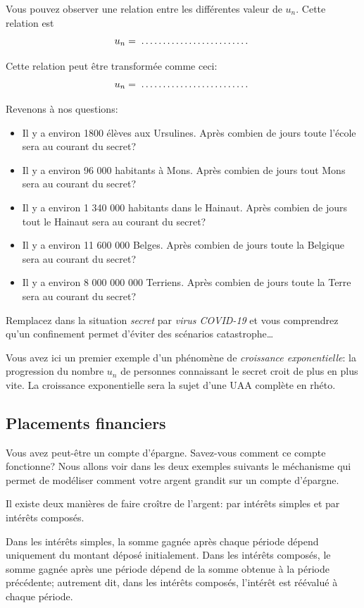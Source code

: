 \documentclass[a4paper,12pt]{report}
\newcommand{\jdot}[1]{ \makebox[#1]{\dotfill}}
\begin{document}
Vous pouvez observer une relation entre les différentes valeur de \(u_{n}\). Cette
relation est
\[
u_{n}=\jdot{4cm}
\]

Cette relation peut être transformée comme ceci:
\[
u_{n}=\jdot{4cm}
\]

Revenons à nos questions:

\begin{itemize}
\item Il y a environ 1800 élèves aux Ursulines. Après combien de jours toute l'école
sera au courant du secret?\dotfill
\item Il y a environ 96 000 habitants à Mons. Après combien de jours tout Mons
sera au courant du secret?\dotfill
\item Il y a environ 1 340 000 habitants dans le Hainaut. Après combien de jours
tout le Hainaut sera au courant du secret?\dotfill
\item Il y a environ 11 600 000 Belges. Après combien de jours toute la Belgique
sera au courant du secret?\dotfill
\item Il y a environ 8 000 000 000 Terriens. Après combien de jours toute la Terre
sera au courant du secret?\dotfill
\end{itemize}

Remplacez dans la situation \emph{secret} par \emph{virus COVID-19} et vous comprendrez
qu'un confinement permet d'éviter des scénarios catastrophe\ldots{}

Vous avez ici un premier exemple d'un phénomène de \emph{croissance exponentielle}:
la progression du nombre \(u_{n}\) de personnes connaissant le secret croit de plus
en plus vite. La croissance exponentielle sera la sujet d'une UAA complète en
rhéto.

\subsection{Placements financiers}
\label{sec:orgd5242be}

Vous avez peut-être un compte d'épargne. Savez-vous comment ce compte
fonctionne? Nous allons voir dans les deux exemples suivants le méchanisme qui
permet de modéliser comment votre argent grandit sur un compte d'épargne.

Il existe deux manières de faire croître de l'argent: par intérêts simples et
par intérêts composés.

Dans les intérêts simples, la somme gagnée après chaque période dépend
uniquement du montant déposé initialement. Dans les intérêts composés, le somme
gagnée après une période dépend de la somme obtenue à la période précédente;
autrement dit, dans les intérêts composés, l'intérêt est réévalué à chaque
période.
\end{document}
